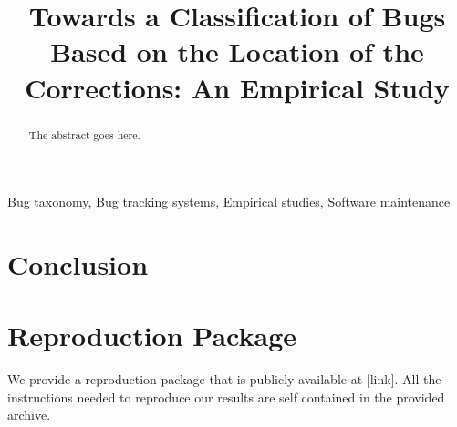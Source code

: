 \documentclass[10pt,journal,compsoc, twoside]{IEEEtran}
\begin{document}
\title{Towards a Classification of Bugs Based on the Location of the Corrections: An Empirical Study}

\author{



}


\maketitle

\begin{abstract}
The abstract goes here.
\end{abstract}

\begin{IEEEkeywords}
Bug taxonomy, Bug tracking systems, Empirical studies,
Software maintenance
\end{IEEEkeywords}


\IEEEpeerreviewmaketitle








\section{Conclusion}


\section{Reproduction Package}

We provide a reproduction package that is publicly available at [link].
All the instructions needed to reproduce our results are self contained in the provided archive.


% 


\ifCLASSOPTIONcaptionsoff
  \newpage
\fi



\end{document}
